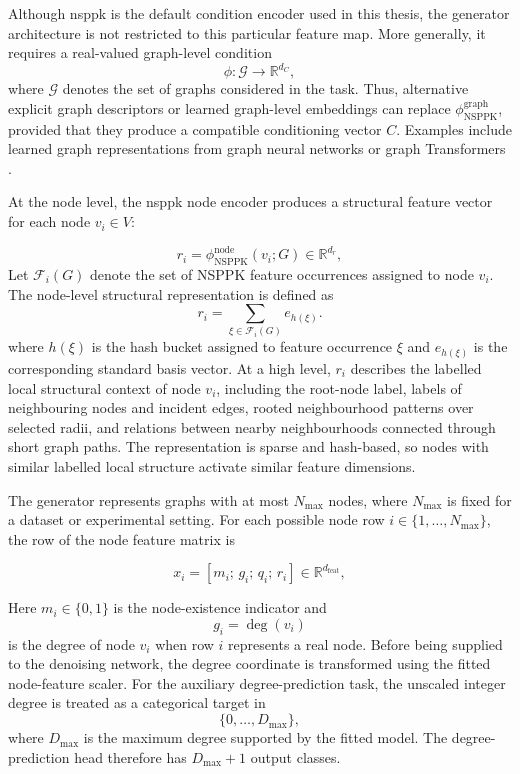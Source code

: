 Although \gls{nsppk} is the default condition encoder used in this thesis, the
generator architecture is not restricted to this particular feature map. More
generally, it requires a real-valued graph-level condition
\[
    \phi:\mathcal{G}\to\mathbb{R}^{d_C},
\]
where \(\mathcal{G}\) denotes the set of graphs considered in the task. Thus,
alternative explicit graph descriptors or learned graph-level embeddings can
replace \(\phi_{\mathrm{NSPPK}}^{\mathrm{graph}}\), provided that they produce a
compatible conditioning vector \(C\). Examples include learned graph
representations from graph neural networks or graph Transformers
\citep{hamilton2017graphsage,zhang2018endtoend,dwivedi2021graph}.

At the node level, the \gls{nsppk} node encoder produces a structural feature
vector for each node \(v_i\in V\):

\[
    r_i
    =
    \phi_{\mathrm{NSPPK}}^{\mathrm{node}}(v_i;G)
    \in
    \mathbb{R}^{d_r},
\]
Let $\mathcal{F}_i(G)$ denote the set of NSPPK feature occurrences assigned to
node $v_i$. The node-level structural representation is defined as
\[
r_i
=
\sum_{\xi\in\mathcal{F}_i(G)}
e_{h(\xi)}.
\]
where $h(\xi)$ is the hash bucket assigned to feature occurrence $\xi$ and
$e_{h(\xi)}$ is the corresponding standard basis vector.  At
a high level, \(r_i\) describes the labelled local structural context of node
\(v_i\), including the root-node label, labels of neighbouring nodes and
incident edges, rooted neighbourhood patterns over selected radii, and
relations between nearby neighbourhoods connected through short graph paths.
The representation is sparse and hash-based, so nodes with similar labelled
local structure activate similar feature dimensions.

The generator represents graphs with at most \(N_{\max}\) nodes, where
\(N_{\max}\) is fixed for a dataset or experimental setting. For each possible
node row \(i\in\{1,\ldots,N_{\max}\}\), the row of the node feature matrix is

\[
x_i
=
\left[
m_i;\,
g_i;\,
q_i;\,
r_i
\right]
\in\mathbb{R}^{d_{\mathrm{feat}}},
\]

Here $m_i\in\{0,1\}$ is the node-existence indicator and
\[
g_i=\deg(v_i)
\]
is the degree of node $v_i$ when row $i$ represents a real node. Before being
supplied to the denoising network, the degree coordinate is transformed using
the fitted node-feature scaler. For the auxiliary degree-prediction task, the
unscaled integer degree is treated as a categorical target in
\[
\{0,\ldots,D_{\max}\},
\]
where $D_{\max}$ is the maximum degree supported by the fitted model. The
degree-prediction head therefore has $D_{\max}+1$ output classes.

